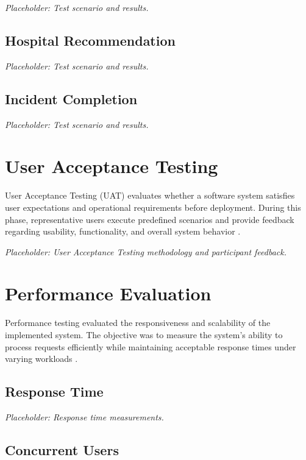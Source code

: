 \textit{Placeholder: Test scenario and results.}

\subsection{Hospital Recommendation}

\textit{Placeholder: Test scenario and results.}

\subsection{Incident Completion}

\textit{Placeholder: Test scenario and results.}


\section{User Acceptance Testing}

User Acceptance Testing (UAT) evaluates whether a software system satisfies user expectations and operational requirements before deployment. During this phase, representative users execute predefined scenarios and provide feedback regarding usability, functionality, and overall system behavior \cite{istqb}.

\textit{Placeholder: User Acceptance Testing methodology and participant feedback.}


\section{Performance Evaluation}

Performance testing evaluated the responsiveness and scalability of the implemented system. The objective was to measure the system's ability to process requests efficiently while maintaining acceptable response times under varying workloads \cite{pressman2020se}.

\subsection{Response Time}

\textit{Placeholder: Response time measurements.}

\subsection{Concurrent Users}


